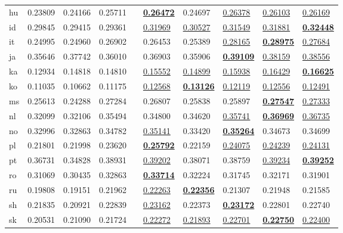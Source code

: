 \begin{longtable}{llllllllll}
hu & 0.23809 & 0.24166 & 0.25711 &  & \underline{\textbf{0.26472}} & 0.24697 & \underline{0.26378} & \underline{0.26103} & \underline{0.26169} \\
id & 0.29845 & 0.29415 & 0.29361 &  & \underline{0.31969} & \underline{0.30527} & \underline{0.31549} & \underline{0.31881} & \underline{\textbf{0.32448}} \\
it & 0.24995 & 0.24960 & 0.26902 &  & 0.26453 & 0.25389 & \underline{0.28165} & \underline{\textbf{0.28975}} & \underline{0.27684} \\
ja & 0.35646 & 0.37742 & 0.36010 &  & 0.36903 & 0.35906 & \underline{\textbf{0.39109}} & \underline{0.38159} & \underline{0.38556} \\
ka & 0.12934 & 0.14818 & 0.14810 &  & \underline{0.15552} & \underline{0.14899} & \underline{0.15938} & \underline{0.16429} & \underline{\textbf{0.16625}} \\
ko & 0.11035 & 0.10662 & 0.11175 &  & \underline{0.12568} & \underline{\textbf{0.13126}} & \underline{0.12119} & \underline{0.12556} & \underline{0.12491} \\
ms & 0.25613 & 0.24288 & 0.27284 &  & 0.26807 & 0.25838 & 0.25897 & \underline{\textbf{0.27547}} & \underline{0.27333} \\
nl & 0.32099 & 0.32106 & 0.35494 &  & 0.34800 & 0.34620 & \underline{0.35741} & \underline{\textbf{0.36969}} & \underline{0.36735} \\
no & 0.32996 & 0.32863 & 0.34782 &  & \underline{0.35141} & 0.33420 & \underline{\textbf{0.35264}} & 0.34673 & 0.34699 \\
pl & 0.21801 & 0.21998 & 0.23620 &  & \underline{\textbf{0.25792}} & 0.22159 & \underline{0.24075} & \underline{0.24239} & \underline{0.24131} \\
pt & 0.36731 & 0.34828 & 0.38931 &  & \underline{0.39202} & 0.38071 & 0.38759 & \underline{0.39234} & \underline{\textbf{0.39252}} \\
ro & 0.31069 & 0.30435 & 0.32863 &  & \underline{\textbf{0.33714}} & 0.32224 & 0.31745 & 0.32171 & 0.31901 \\
ru & 0.19808 & 0.19151 & 0.21962 &  & \underline{0.22263} & \underline{\textbf{0.22356}} & 0.21307 & 0.21948 & 0.21585 \\
sh & 0.21835 & 0.20921 & 0.22839 &  & \underline{0.23162} & 0.22373 & \underline{\textbf{0.23172}} & 0.22801 & 0.22740 \\
sk & 0.20531 & 0.21090 & 0.21724 &  & \underline{0.22272} & \underline{0.21893} & \underline{0.22701} & \underline{\textbf{0.22750}} & \underline{0.22400} \\

\end{longtable}
